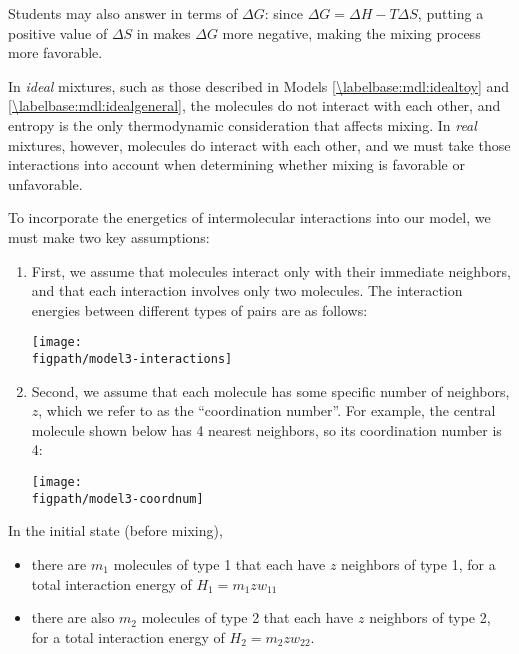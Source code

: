 \begin{activity}
\begin{ctqs}
\begin{solution}[2.5in]
			Students may also answer in terms of $\Delta G$: since $\Delta G = \Delta H - T\Delta S$, putting a positive value of $\Delta S$ in makes $\Delta G$ more negative, making the mixing process more favorable.
		\end{solution}
		
\end{ctqs}
	

\begin{model}
\label{\labelbase:mdl:regular}

In \emph{ideal} mixtures, such as those described in Models \ref{\labelbase:mdl:idealtoy} and \ref{\labelbase:mdl:idealgeneral}, the molecules do not interact with each other, and entropy is the only thermodynamic consideration that affects mixing.
In \emph{real} mixtures, however, molecules do interact with each other, and we must take those interactions into account when determining whether mixing is favorable or unfavorable.

To incorporate the energetics of intermolecular interactions into our model, we must make two key assumptions:
\begin{enumerate}
	\item First, we assume that molecules interact only with their immediate neighbors, and that each interaction involves only two molecules.  The interaction energies between different types of pairs are as follows:

\centerline{\texttt{[image: \\figpath/model3-interactions]}}
	
	\item Second, we assume that each molecule has some specific number of neighbors, $z$, which we refer to as the ``coordination number''.  For example, the central molecule shown below has 4 nearest neighbors, so its coordination number is 4:

\centerline{\texttt{[image: \\figpath/model3-coordnum]}}


\end{enumerate}

\end{model}

\begin{ctqs}

	\question In the initial state (before mixing), 
		\begin{itemize}[itemsep=0pt,topsep=3pt]
			\item there are $m_1$ molecules of type 1 that each have $z$ neighbors of type 1, for a total interaction energy of $H_{1} = m_1 z w_{11}$
			\item there are also $m_2$ molecules of type 2 that each have $z$ neighbors of type 2, for a total interaction energy of $H_{2} = m_2 z w_{22}$.
		\end{itemize}
		

\end{ctqs}
\end{activity}
